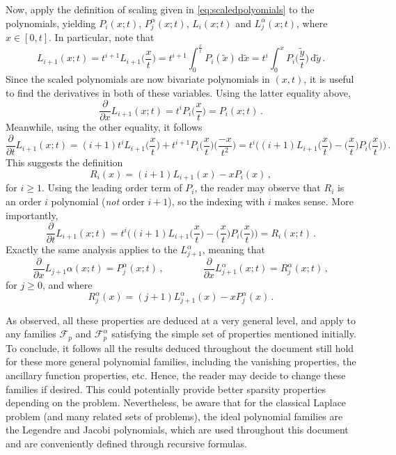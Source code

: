 Now, apply the definition of scaling given in \eqref{eq:scaledpolyomials} to the polynomials, yielding $P_i(x;t)$, $P_j^\alpha(x;t)$, $L_i(x;t)$ and $L_j^\alpha(x;t)$, where $x\in[0,t]$.
In particular, note that
\begin{equation}
	L_{i+1}(x;t)=t^{i+1}L_{i+1}\Big(\frac{x}{t}\Big)=t^{i+1}\int_0^{\frac{x}{t}} P_{i}(\tilde{x})\,\mathrm{d}\tilde{x}
		=t^{i}\int_0^{x} P_{i}\Big(\frac{\tilde{y}}{t}\Big)\,\mathrm{d}\tilde{y}\,.
\end{equation}
Since the scaled polynomials are now bivariate polynomials in $(x,t)$, it is useful to find the derivatives in both of these variables.
Using the latter equality above,
\begin{equation}
	\frac{\partial}{\partial x}L_{i+1}(x;t)=t^iP_i\Big(\frac{x}{t}\Big)=P_i(x;t)\,.
\end{equation}
Meanwhile, using the other equality, it follows
\begin{equation}
	\frac{\partial}{\partial t}L_{i+1}(x;t)
		=(i+1)t^iL_{i+1}\Big(\frac{x}{t}\Big)+t^{i+1}P_{i}\Big(\frac{x}{t}\Big)\Big(\frac{-x}{t^2}\Big)
			=t^i\Big((i+1)L_{i+1}\Big(\frac{x}{t}\Big)-\Big(\frac{x}{t}\Big)P_{i}\Big(\frac{x}{t}\Big)\Big)\,.
\end{equation}
This suggests the definition
\begin{equation}
	R_i(x)=(i+1)L_{i+1}(x) - xP_i(x)\,,
	\label{eq:R_i_eq1}
\end{equation}
for $i\geq1$.
Using the leading order term of $P_i$, the reader may observe that $R_i$ is an order $i$ polynomial (\textit{not} order $i+1$), so the indexing with $i$ makes sense.
More importantly,
\begin{equation}
	\frac{\partial}{\partial t}L_{i+1}(x;t)
			=t^i\Big((i+1)L_{i+1}\Big(\frac{x}{t}\Big)-\Big(\frac{x}{t}\Big)P_{i}\Big(\frac{x}{t}\Big)\Big)
				=R_{i}(x;t)\,.
\end{equation}
Exactly the same analysis applies to the $L_{j+1}^\alpha$, meaning that
\begin{equation}
	\frac{\partial}{\partial x}L_{j+1}\alpha(x;t)=P_j^\alpha(x;t)\,,\qquad\qquad
		\frac{\partial}{\partial x}L_{j+1}^\alpha(x;t)=R_j^\alpha(x;t)\,,
\end{equation}
for $j\geq0$, and where
\begin{equation}
	R_j^\alpha(x)=(j+1)L_{j+1}^\alpha(x) - xP_j^\alpha(x)\,.
\end{equation}

As observed, all these properties are deduced at a very general level, and apply to any families $\mathcal{F}_p$ and $\mathcal{F}_p^\alpha$ satisfying the simple set of properties mentioned initially.
To conclude, it follows all the results deduced throughout the document still hold for these more general polynomial families, including the vanishing properties, the ancillary function properties, etc.
Hence, the reader may decide to change these families if desired.
This could potentially provide better sparsity properties depending on the problem.
Nevertheless, be aware that for the classical Laplace problem (and many related sets of problems), the ideal polynomial families are the Legendre and Jacobi polynomials, which are used throughout this document and are conveniently defined through recursive formulas.

